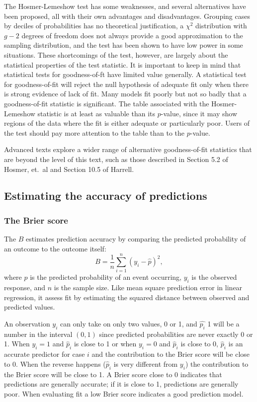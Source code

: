 The Hosmer-Lemeshow test has some weaknesses, and several alternatives have been proposed, all with their own advantages and disadvantages.  Grouping cases by deciles of probabilities has no theoretical justification, a $\chi^2$  distribution with $g - 2$ degrees of freedom does not always provide a good approximation to the sampling distribution, and the test has been shown to have low power in some situations.  These shortcomings of the test, however, are largely about the statistical properties of the test statistic.  It is important to keep in mind that statistical tests for goodness-of-ft have limited value generally.  A statistical test for goodness-of-fit will reject the null hypothesis of adequate fit only when there is strong evidence of lack of fit.  Many models fit poorly but not so badly that a goodness-of-fit statistic is significant.  The table associated with the Hosmer-Lemeshow statistic is at least as valuable than its $p$-value, since it may show regions of the data where the fit is either adequate or particularly poor. Users of the test should pay more attention to the table than to the $p$-value.

 Advanced texts explore a wider range of alternative goodness-of-fit statistics that are beyond the level of this text, such as those described in Section 5.2 of Hosmer, et.\ al and Section 10.5 of Harrell.

\subsection{Estimating the accuracy of predictions}
\label{section:predictiveAccuracy}

 \subsubsection{The Brier score}

The  $B$ estimates prediction accuracy by comparing the predicted probability of an outcome to the outcome itself:
       \[ B = \dfrac{1}{n}\sum_{i = 1}^n (y_i - \hat{p})^2,  \]
where $\hat{p}$ is the predicted probability of an event occurring, $y_i$ is the observed response, and $n$ is the sample size. Like mean square prediction error in linear regression, it assess fit by estimating the squared distance between observed and predicted values.

An observation $y_i$ can only take on only two values, 0 or 1, and $\hat{p_i}$ 1 will be a number in the interval $(0,1)$ since predicted probabilities are never exactly 0 or 1.  When $y_i = 1$ and $\hat{p}_i$ is close to 1 or when $y_i = 0$ and  $\hat{p}_i$ is close to 0, $\hat{p}_i$ is an accurate predictor for case $i$ and the contribution to the Brier score will be close to 0.  When the reverse happens ($\hat{p}_i$ is very different from $y_i$) the contribution to the Brier score will be close to 1.  A Brier score close to 0 indicates that predictions are generally accurate; if it is close to 1, predictions are generally poor.  When evaluating fit a low Brier score indicates a good prediction model.

